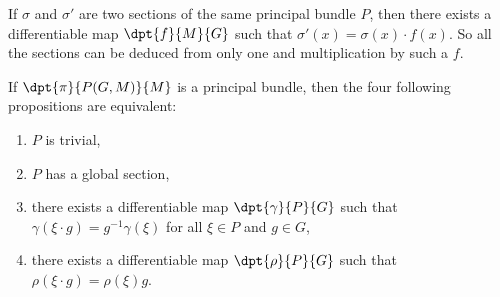 If $\sigma$ and $\sigma'$ are two sections of the same principal bundle $P$, then there exists a differentiable map $\dpt{f}{M}{G}$ such that $\sigma'(x)=\sigma(x)\cdot f(x)$. So all the sections can be deduced from only one and multiplication by such a $f$.

\begin{theorem}
If $\dpt{\pi}{P(G,M)}{M}$ is a principal bundle, then the four following propositions are equivalent:
\begin{enumerate}
\item\label{enuymai} $P$ is trivial,
\item\label{enuymaii} $P$ has a global section,
\item\label{enuymaiii} there exists a differentiable map $\dpt{\gamma}{P}{G}$ such that $\gamma(\xi\cdot g)=g^{-1}\gamma(\xi)$ for all $\xi\in P$ and $g\in G$,
\item\label{enuymaiv} there exists a differentiable map $\dpt{\rho}{P}{G}$ such that $\rho(\xi\cdot g)=\rho(\xi)g$.
\end{enumerate}
\label{ThoYPrincBTrivSect}
\end{theorem}

